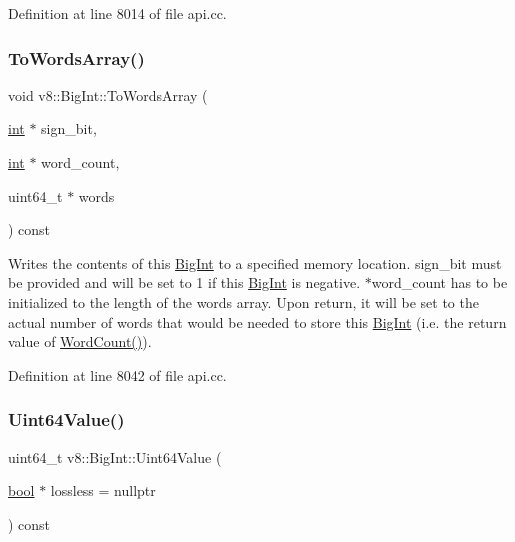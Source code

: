 Definition at line 8014 of file api.\+cc.

\mbox{\label{classv8_1_1BigInt_adbc582fd6ae26b6afe9b5591b5fe06e7}} 
\subsubsection{\texorpdfstring{To\+Words\+Array()}{ToWordsArray()}}
{\footnotesize\ttfamily void v8\+::\+Big\+Int\+::\+To\+Words\+Array (\begin{DoxyParamCaption}\item[{\mbox{\hyperlink{classint}{int}} $\ast$}]{sign\+\_\+bit,  }\item[{\mbox{\hyperlink{classint}{int}} $\ast$}]{word\+\_\+count,  }\item[{uint64\+\_\+t $\ast$}]{words }\end{DoxyParamCaption}) const}

Writes the contents of this \mbox{\hyperlink{classv8_1_1BigInt}{Big\+Int}} to a specified memory location. {\ttfamily sign\+\_\+bit} must be provided and will be set to 1 if this \mbox{\hyperlink{classv8_1_1BigInt}{Big\+Int}} is negative. {\ttfamily $\ast$word\+\_\+count} has to be initialized to the length of the {\ttfamily words} array. Upon return, it will be set to the actual number of words that would be needed to store this \mbox{\hyperlink{classv8_1_1BigInt}{Big\+Int}} (i.\+e. the return value of {\ttfamily \mbox{\hyperlink{classv8_1_1BigInt_a840783db8ae94178040c5a8a7bb52875}{Word\+Count()}}}). 

Definition at line 8042 of file api.\+cc.

\mbox{\label{classv8_1_1BigInt_a32d8d340aef40da93cde35a9baf7e58d}} 
\subsubsection{\texorpdfstring{Uint64\+Value()}{Uint64Value()}}
{\footnotesize\ttfamily uint64\+\_\+t v8\+::\+Big\+Int\+::\+Uint64\+Value (\begin{DoxyParamCaption}\item[{\mbox{\hyperlink{classbool}{bool}} $\ast$}]{lossless = {\ttfamily nullptr} }\end{DoxyParamCaption}) const}

